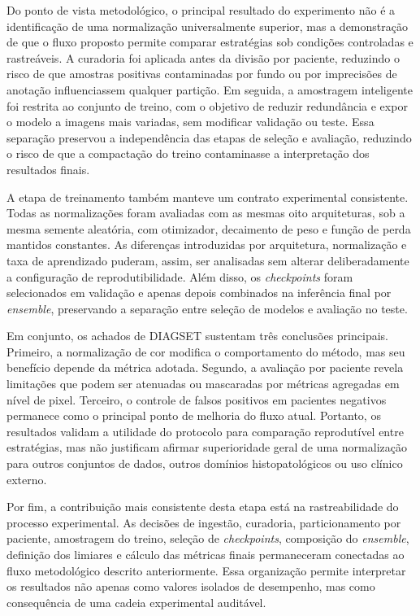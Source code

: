 Do ponto de vista metodológico, o principal resultado do experimento não é a identificação de uma normalização universalmente superior, mas a demonstração de que o fluxo proposto permite comparar estratégias sob condições controladas e rastreáveis. A curadoria foi aplicada antes da divisão por paciente, reduzindo o risco de que amostras positivas contaminadas por fundo ou por imprecisões de anotação influenciassem qualquer partição. Em seguida, a amostragem inteligente foi restrita ao conjunto de treino, com o objetivo de reduzir redundância e expor o modelo a imagens mais variadas, sem modificar validação ou teste. Essa separação preservou a independência das etapas de seleção e avaliação, reduzindo o risco de que a compactação do treino contaminasse a interpretação dos resultados finais.

A etapa de treinamento também manteve um contrato experimental consistente. Todas as normalizações foram avaliadas com as mesmas oito arquiteturas, sob a mesma semente aleatória, com otimizador, decaimento de peso e função de perda mantidos constantes. As diferenças introduzidas por arquitetura, normalização e taxa de aprendizado puderam, assim, ser analisadas sem alterar deliberadamente a configuração de reprodutibilidade. Além disso, os \textit{checkpoints} foram selecionados em validação e apenas depois combinados na inferência final por \textit{ensemble}, preservando a separação entre seleção de modelos e avaliação no teste.

Em conjunto, os achados de DIAGSET sustentam três conclusões principais. Primeiro, a normalização de cor modifica o comportamento do método, mas seu benefício depende da métrica adotada. Segundo, a avaliação por paciente revela limitações que podem ser atenuadas ou mascaradas por métricas agregadas em nível de pixel. Terceiro, o controle de falsos positivos em pacientes negativos permanece como o principal ponto de melhoria do fluxo atual. Portanto, os resultados validam a utilidade do protocolo para comparação reprodutível entre estratégias, mas não justificam afirmar superioridade geral de uma normalização para outros conjuntos de dados, outros domínios histopatológicos ou uso clínico externo.

Por fim, a contribuição mais consistente desta etapa está na rastreabilidade do processo experimental. As decisões de ingestão, curadoria, particionamento por paciente, amostragem do treino, seleção de \textit{checkpoints}, composição do \textit{ensemble}, definição dos limiares e cálculo das métricas finais permaneceram conectadas ao fluxo metodológico descrito anteriormente. Essa organização permite interpretar os resultados não apenas como valores isolados de desempenho, mas como consequência de uma cadeia experimental auditável.
